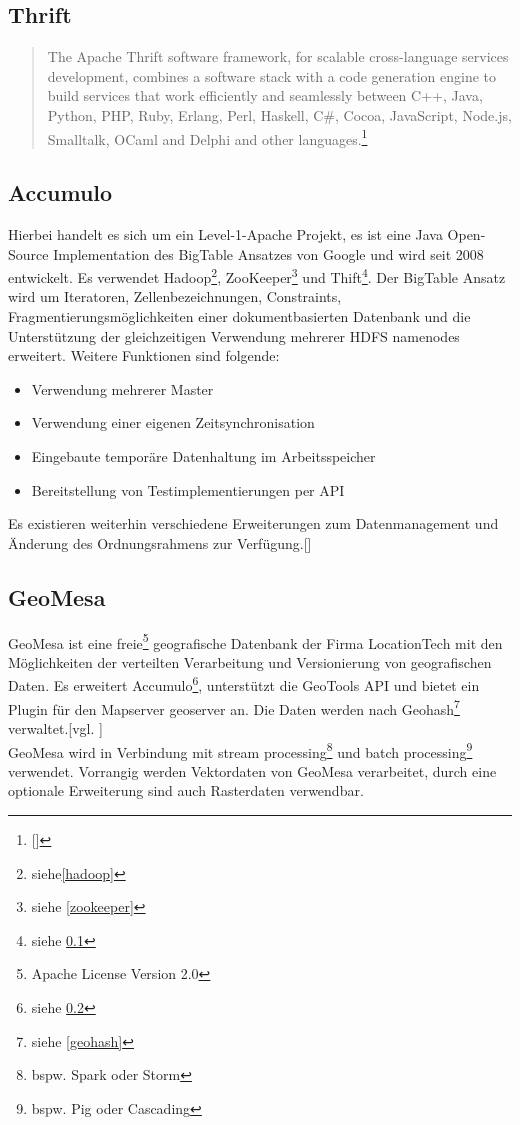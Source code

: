 \subsection{Thrift}
\label{thrift}
\begin{quote}
The Apache Thrift software framework, for scalable cross-language services development, combines a software stack with a code generation engine to build services that work efficiently and seamlessly between C++, Java, Python, PHP, Ruby, Erlang, Perl, Haskell, C\#, Cocoa, JavaScript, Node.js, Smalltalk, OCaml and Delphi and other languages.\footnote{[\cite{website:thrift}]}
\end{quote}


\subsection{Accumulo}
\label{accumulo}
Hierbei handelt es sich um ein Level-1-Apache Projekt, es ist eine Java Open-Source Implementation des BigTable Ansatzes von Google und wird seit 2008 entwickelt.
Es verwendet Hadoop\footnote{siehe\ref{hadoop}}, ZooKeeper\footnote{siehe \ref{zookeeper}} und Thift\footnote{siehe \ref{thrift}}.
Der BigTable Ansatz wird um Iteratoren, Zellenbezeichnungen, Constraints, Fragmentierungsmöglichkeiten einer dokumentbasierten Datenbank und die Unterstützung der gleichzeitigen Verwendung mehrerer HDFS namenodes erweitert.
Weitere Funktionen sind folgende:
\begin{itemize}
\item Verwendung mehrerer Master
\item Verwendung einer eigenen Zeitsynchronisation
\item Eingebaute temporäre Datenhaltung im Arbeitsspeicher
\item Bereitstellung von Testimplementierungen per API
\end {itemize}
Es existieren weiterhin verschiedene Erweiterungen zum Datenmanagement und Änderung des Ordnungsrahmens zur Verfügung.[\cite{website:accumulo_features}]

\subsection{GeoMesa}

GeoMesa ist eine freie\footnote{Apache License Version 2.0} geografische Datenbank der Firma LocationTech mit den Möglichkeiten der verteilten Verarbeitung und Versionierung von geografischen Daten.
Es erweitert Accumulo\footnote{siehe \ref{accumulo}},  unterstützt die GeoTools API und bietet ein Plugin für den Mapserver \Gls{geoserver} an.
Die Daten werden nach Geohash\footnote{siehe \ref{geohash}} verwaltet.[vgl. \cite{website:geomesaeclipse}]\\
GeoMesa wird in Verbindung mit stream processing\footnote{bspw. Spark oder Storm} und batch processing\footnote{bspw. Pig oder Cascading} verwendet.
Vorrangig werden Vektordaten von GeoMesa verarbeitet, durch eine optionale Erweiterung sind auch Rasterdaten verwendbar.

